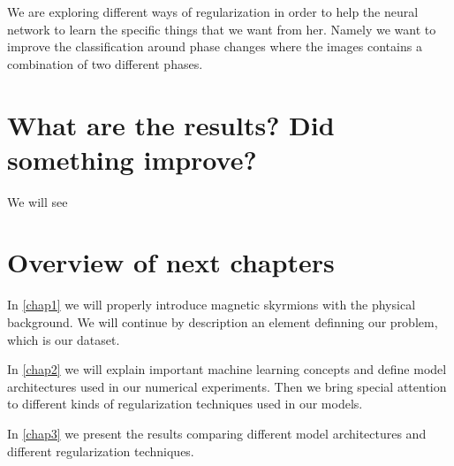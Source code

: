 We are exploring different ways of regularization in order to help the neural network to learn the specific things that we want from her. Namely we want to improve the classification around phase changes where the images contains a combination of two different phases.

\section{What are the results? Did something improve?}

We will see

\section{Overview of next chapters}

In \ref{chap1} we will properly introduce magnetic skyrmions with the physical background. We will continue by description an element definning our problem, which is our dataset.

In \ref{chap2} we will explain important machine learning concepts and define model architectures used in our numerical experiments. Then we bring special attention to different kinds of regularization techniques used in our models.

In \ref{chap3} we present the results comparing different model architectures and different regularization techniques.

